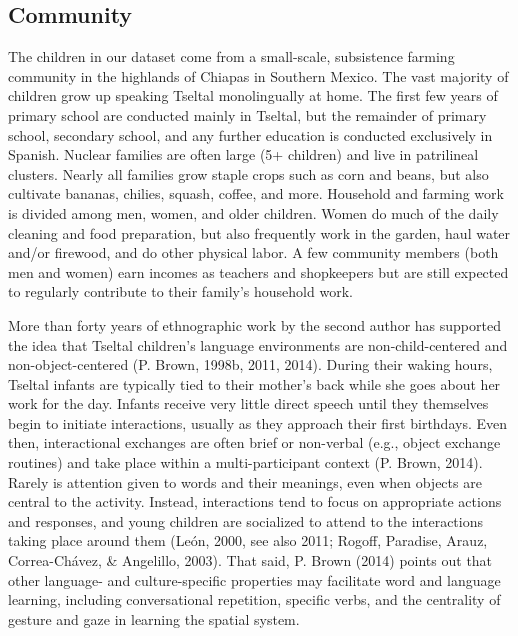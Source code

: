 \documentclass[floatsintext,man]{apa6}
\theoremstyle{definition}
\theoremstyle{definition}
\theoremstyle{definition}
\theoremstyle{remark}
\begin{document}
\subsection{Community}\label{methods-community}

The children in our dataset come from a small-scale, subsistence farming
community in the highlands of Chiapas in Southern Mexico. The vast
majority of children grow up speaking Tseltal monolingually at home. The
first few years of primary school are conducted mainly in Tseltal, but
the remainder of primary school, secondary school, and any further
education is conducted exclusively in Spanish. Nuclear families are
often large (5+ children) and live in patrilineal clusters. Nearly all
families grow staple crops such as corn and beans, but also cultivate
bananas, chilies, squash, coffee, and more. Household and farming work
is divided among men, women, and older children. Women do much of the
daily cleaning and food preparation, but also frequently work in the
garden, haul water and/or firewood, and do other physical labor. A few
community members (both men and women) earn incomes as teachers and
shopkeepers but are still expected to regularly contribute to their
family's household work.

More than forty years of ethnographic work by the second author has
supported the idea that Tseltal children's language environments are
non-child-centered and non-object-centered (P. Brown, 1998b, 2011,
2014). During their waking hours, Tseltal infants are typically tied to
their mother's back while she goes about her work for the day. Infants
receive very little direct speech until they themselves begin to
initiate interactions, usually as they approach their first birthdays.
Even then, interactional exchanges are often brief or non-verbal (e.g.,
object exchange routines) and take place within a multi-participant
context (P. Brown, 2014). Rarely is attention given to words and their
meanings, even when objects are central to the activity. Instead,
interactions tend to focus on appropriate actions and responses, and
young children are socialized to attend to the interactions taking place
around them (León, 2000, see also 2011; Rogoff, Paradise, Arauz,
Correa-Chávez, \& Angelillo, 2003). That said, P. Brown (2014) points
out that other language- and culture-specific properties may facilitate
word and language learning, including conversational repetition,
specific verbs, and the centrality of gesture and gaze in learning the
spatial system.
\end{document}
